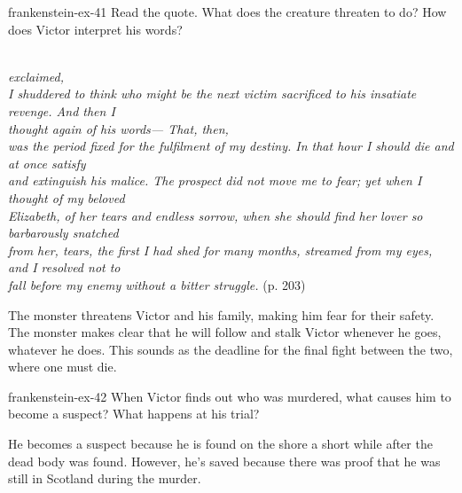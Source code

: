 \documentclass[preview]{standalone}
\begin{document}
\begin{snippetexercise}{frankenstein-ex-41}
    {Read the quote. What does the creature threaten to do? How does Victor interpret his words?}
    
    \begin{center}
        \\
        \textit{exclaimed, }\\
        \textit{I shuddered to think who might be the next victim sacrificed to his insatiate revenge. And then I}\\
        \textit{thought again of his words— That, then,}\\
        \textit{was the period fixed for the fulfilment of my destiny. In that hour I should die and at once satisfy}\\
        \textit{and extinguish his malice. The prospect did not move me to fear; yet when I thought of my beloved}\\
        \textit{Elizabeth, of her tears and endless sorrow, when she should find her lover so barbarously snatched}\\
        \textit{from her, tears, the first I had shed for many months, streamed from my eyes, and I resolved not to}\\
        \textit{fall before my enemy without a bitter struggle.} (p. 203)
    \end{center}
    
    The monster threatens Victor and his family, making him fear for their safety.
    The monster makes clear that he will follow and stalk Victor whenever he goes,
    whatever he does. This sounds as the deadline for the final fight between the two,
    where one must die. 
\end{snippetexercise}

\begin{snippetexercise}{frankenstein-ex-42}
    {When Victor finds out who was murdered, what causes him to become a suspect? What happens
    at his trial?}
    
    He becomes a suspect because he is found on the shore a short while after the dead body
    was found. However, he's saved because there was proof that he was still in Scotland during the murder. 
\end{snippetexercise}
\end{document}
